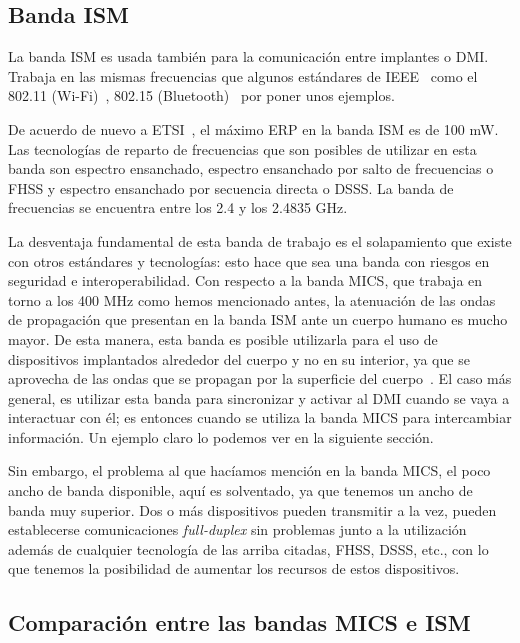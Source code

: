 \subsection{Banda ISM}\label{subsec:banda-ism}

La banda ISM es usada también para la comunicación entre implantes o DMI. Trabaja en las mismas frecuencias que algunos estándares de IEEE~\cite{IEEE} como el 802.11 (Wi-Fi)~\cite{wifi}, 802.15 (Bluetooth)~\cite{bluetooth} por poner unos ejemplos.

De acuerdo de nuevo a ETSI~\cite{etsi}, el máximo ERP en la banda ISM es de 100 mW. Las tecnologías de reparto de frecuencias que son posibles de utilizar en esta banda son espectro ensanchado, espectro ensanchado por salto de frecuencias o FHSS y espectro ensanchado por secuencia directa o DSSS. La banda de frecuencias se encuentra entre los 2.4 y los 2.4835 GHz.

La desventaja fundamental de esta banda de trabajo es el solapamiento que existe con otros estándares y tecnologías: esto hace que sea una banda con riesgos en seguridad e interoperabilidad. Con respecto a la banda MICS, que trabaja en torno a los 400 MHz como hemos mencionado antes, la atenuación de las ondas de propagación que presentan en la banda ISM ante un cuerpo humano es mucho mayor. De esta manera, esta banda es posible utilizarla para el uso de dispositivos implantados alrededor del cuerpo y no en su interior, ya que se aprovecha de las ondas que se propagan por la superficie del cuerpo~\cite{conway,yang9}. El caso más general, es utilizar esta banda para sincronizar y activar al DMI cuando se vaya a interactuar con él; es entonces cuando se utiliza la banda MICS para intercambiar información. Un ejemplo claro lo podemos ver en la siguiente sección.

Sin embargo, el problema al que hacíamos mención en la banda MICS, el poco ancho de banda disponible, aquí es solventado, ya que tenemos un ancho de banda muy superior. Dos o más dispositivos pueden transmitir a la vez, pueden establecerse comunicaciones \textit{full-duplex} sin problemas junto a la utilización además de cualquier tecnología de las arriba citadas, FHSS, DSSS, etc., con lo que tenemos la posibilidad de aumentar los recursos de estos dispositivos.

\subsection{Comparación entre las bandas MICS e ISM}\label{subsec:comparacion}

